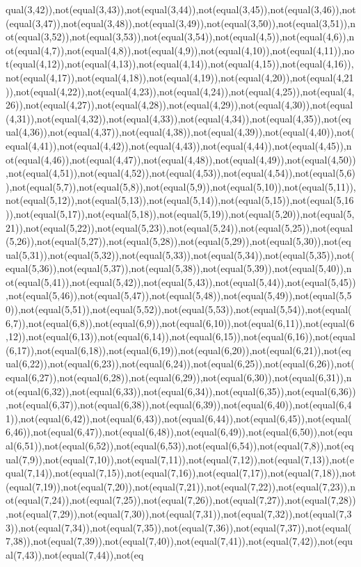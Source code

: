 qual(3,42)),not(equal(3,43)),not(equal(3,44)),not(equal(3,45)),not(equal(3,46)),not(equal(3,47)),not(equal(3,48)),not(equal(3,49)),not(equal(3,50)),not(equal(3,51)),not(equal(3,52)),not(equal(3,53)),not(equal(3,54)),not(equal(4,5)),not(equal(4,6)),not(equal(4,7)),not(equal(4,8)),not(equal(4,9)),not(equal(4,10)),not(equal(4,11)),not(equal(4,12)),not(equal(4,13)),not(equal(4,14)),not(equal(4,15)),not(equal(4,16)),not(equal(4,17)),not(equal(4,18)),not(equal(4,19)),not(equal(4,20)),not(equal(4,21)),not(equal(4,22)),not(equal(4,23)),not(equal(4,24)),not(equal(4,25)),not(equal(4,26)),not(equal(4,27)),not(equal(4,28)),not(equal(4,29)),not(equal(4,30)),not(equal(4,31)),not(equal(4,32)),not(equal(4,33)),not(equal(4,34)),not(equal(4,35)),not(equal(4,36)),not(equal(4,37)),not(equal(4,38)),not(equal(4,39)),not(equal(4,40)),not(equal(4,41)),not(equal(4,42)),not(equal(4,43)),not(equal(4,44)),not(equal(4,45)),not(equal(4,46)),not(equal(4,47)),not(equal(4,48)),not(equal(4,49)),not(equal(4,50)),not(equal(4,51)),not(equal(4,52)),not(equal(4,53)),not(equal(4,54)),not(equal(5,6)),not(equal(5,7)),not(equal(5,8)),not(equal(5,9)),not(equal(5,10)),not(equal(5,11)),not(equal(5,12)),not(equal(5,13)),not(equal(5,14)),not(equal(5,15)),not(equal(5,16)),not(equal(5,17)),not(equal(5,18)),not(equal(5,19)),not(equal(5,20)),not(equal(5,21)),not(equal(5,22)),not(equal(5,23)),not(equal(5,24)),not(equal(5,25)),not(equal(5,26)),not(equal(5,27)),not(equal(5,28)),not(equal(5,29)),not(equal(5,30)),not(equal(5,31)),not(equal(5,32)),not(equal(5,33)),not(equal(5,34)),not(equal(5,35)),not(equal(5,36)),not(equal(5,37)),not(equal(5,38)),not(equal(5,39)),not(equal(5,40)),not(equal(5,41)),not(equal(5,42)),not(equal(5,43)),not(equal(5,44)),not(equal(5,45)),not(equal(5,46)),not(equal(5,47)),not(equal(5,48)),not(equal(5,49)),not(equal(5,50)),not(equal(5,51)),not(equal(5,52)),not(equal(5,53)),not(equal(5,54)),not(equal(6,7)),not(equal(6,8)),not(equal(6,9)),not(equal(6,10)),not(equal(6,11)),not(equal(6,12)),not(equal(6,13)),not(equal(6,14)),not(equal(6,15)),not(equal(6,16)),not(equal(6,17)),not(equal(6,18)),not(equal(6,19)),not(equal(6,20)),not(equal(6,21)),not(equal(6,22)),not(equal(6,23)),not(equal(6,24)),not(equal(6,25)),not(equal(6,26)),not(equal(6,27)),not(equal(6,28)),not(equal(6,29)),not(equal(6,30)),not(equal(6,31)),not(equal(6,32)),not(equal(6,33)),not(equal(6,34)),not(equal(6,35)),not(equal(6,36)),not(equal(6,37)),not(equal(6,38)),not(equal(6,39)),not(equal(6,40)),not(equal(6,41)),not(equal(6,42)),not(equal(6,43)),not(equal(6,44)),not(equal(6,45)),not(equal(6,46)),not(equal(6,47)),not(equal(6,48)),not(equal(6,49)),not(equal(6,50)),not(equal(6,51)),not(equal(6,52)),not(equal(6,53)),not(equal(6,54)),not(equal(7,8)),not(equal(7,9)),not(equal(7,10)),not(equal(7,11)),not(equal(7,12)),not(equal(7,13)),not(equal(7,14)),not(equal(7,15)),not(equal(7,16)),not(equal(7,17)),not(equal(7,18)),not(equal(7,19)),not(equal(7,20)),not(equal(7,21)),not(equal(7,22)),not(equal(7,23)),not(equal(7,24)),not(equal(7,25)),not(equal(7,26)),not(equal(7,27)),not(equal(7,28)),not(equal(7,29)),not(equal(7,30)),not(equal(7,31)),not(equal(7,32)),not(equal(7,33)),not(equal(7,34)),not(equal(7,35)),not(equal(7,36)),not(equal(7,37)),not(equal(7,38)),not(equal(7,39)),not(equal(7,40)),not(equal(7,41)),not(equal(7,42)),not(equal(7,43)),not(equal(7,44)),not(eq